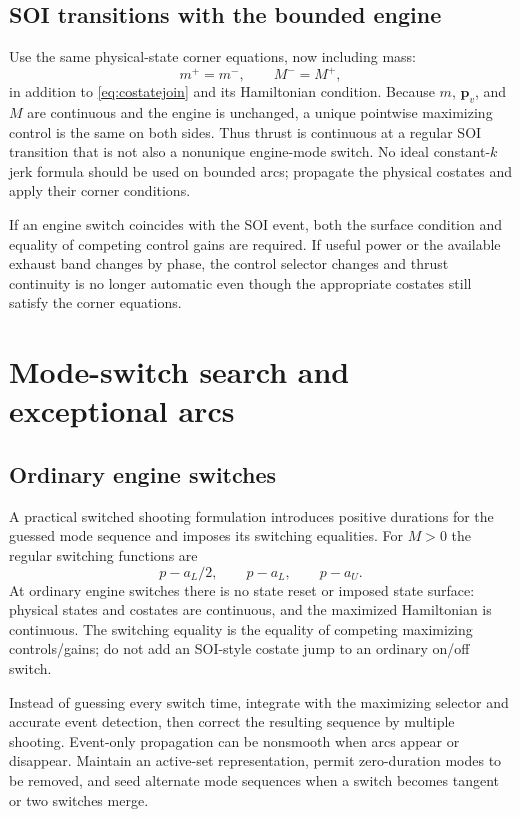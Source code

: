 \documentclass[journal, a4paper]{IEEEtran}
\begin{document}
\subsection{SOI transitions with the bounded engine}
Use the same physical-state corner equations, now including mass:
\begin{equation}
 m^+=m^-,\qquad M^-=M^+,
\end{equation}
in addition to \eqref{eq:costatejoin} and its Hamiltonian condition. Because $m$, $\mathbf p_v$, and $M$ are continuous and the engine is unchanged, a unique pointwise maximizing control is the same on both sides. Thus thrust is continuous at a regular SOI transition that is not also a nonunique engine-mode switch. No ideal constant-$k$ jerk formula should be used on bounded arcs; propagate the physical costates and apply their corner conditions.

If an engine switch coincides with the SOI event, both the surface condition and equality of competing control gains are required. If useful power or the available exhaust band changes by phase, the control selector changes and thrust continuity is no longer automatic even though the appropriate costates still satisfy the corner equations.

\section{Mode-switch search and exceptional arcs}
\subsection{Ordinary engine switches}
A practical switched shooting formulation introduces positive durations for the guessed mode sequence and imposes its switching equalities. For $M>0$ the regular switching functions are
\begin{equation}
 p-a_L/2,\qquad p-a_L,\qquad p-a_U.
\end{equation}
At ordinary engine switches there is no state reset or imposed state surface: physical states and costates are continuous, and the maximized Hamiltonian is continuous. The switching equality is the equality of competing maximizing controls/gains; do not add an SOI-style costate jump to an ordinary on/off switch.

Instead of guessing every switch time, integrate with the maximizing selector and accurate event detection, then correct the resulting sequence by multiple shooting. Event-only propagation can be nonsmooth when arcs appear or disappear. Maintain an active-set representation, permit zero-duration modes to be removed, and seed alternate mode sequences when a switch becomes tangent or two switches merge.
\end{document}
